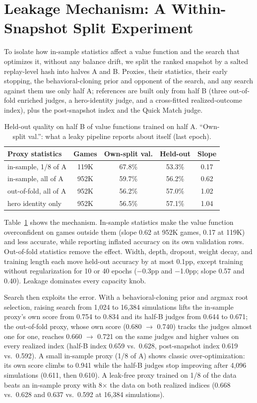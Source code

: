 \documentclass[journal]{IEEEtran}
\begin{document}
\section{Leakage Mechanism: A Within-Snapshot Split Experiment}
\label{sec:split}

To isolate how in-sample statistics affect a value function and the search that optimizes it, without any balance drift, we split the ranked snapshot by a salted replay-level hash into halves A and B. Proxies, their statistics, their early stopping, the behavioral-cloning prior and opponent of the search, and any search against them use only half A; references are built only from half B (three out-of-fold enriched judges, a hero-identity judge, and a cross-fitted realized-outcome index), plus the post-snapshot index and the Quick Match judge.

\begin{table}[t]
\centering
\caption{Held-out quality on half B of value functions trained on half A. ``Own-split val.'': what a leaky pipeline reports about itself (last epoch).}
\label{tab:split}
\setlength{\tabcolsep}{3.5pt}
\begin{tabular}{lcccc}
\toprule
Proxy statistics & Games & Own-split val. & Held-out & Slope \\
\midrule
in-sample, 1/8 of A & 119K & 67.8\% & 53.3\% & 0.17 \\
in-sample, all of A & 952K & 59.7\% & 56.2\% & 0.62 \\
out-of-fold, all of A & 952K & 56.2\% & 57.0\% & 1.02 \\
hero identity only & 952K & 56.5\% & 57.1\% & 1.04 \\
\bottomrule
\end{tabular}
\end{table}

Table~\ref{tab:split} shows the mechanism. In-sample statistics make the value function overconfident on games outside them (slope 0.62 at 952K games, 0.17 at 119K) and less accurate, while reporting inflated accuracy on its own validation rows. Out-of-fold statistics remove the effect. Width, depth, dropout, weight decay, and training length each move held-out accuracy by at most 0.1pp, except training without regularization for 10 or 40 epochs ($-$0.3pp and $-$1.0pp; slope 0.57 and 0.40). Leakage dominates every capacity knob.

Search then exploits the error. With a behavioral-cloning prior and argmax root selection, raising search from 1,024 to 16,384 simulations lifts the in-sample proxy's own score from 0.754 to 0.834 and its half-B judges from 0.644 to 0.671; the out-of-fold proxy, whose own score (0.680 $\to$ 0.740) tracks the judges almost one for one, reaches 0.660 $\to$ 0.721 on the same judges and higher values on every realized index (half-B index 0.659 vs.\ 0.628, post-snapshot index 0.619 vs.\ 0.592). A small in-sample proxy (1/8 of A) shows classic over-optimization: its own score climbs to 0.941 while the half-B judges stop improving after 4,096 simulations (0.611, then 0.610). A leak-free proxy trained on 1/8 of the data beats an in-sample proxy with 8$\times$ the data on both realized indices (0.668 vs.\ 0.628 and 0.637 vs.\ 0.592 at 16,384 simulations).
\end{document}
